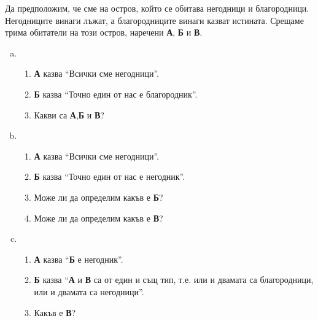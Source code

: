 \begin{problem}
  Да предположим, че сме на остров, който се обитава негодници и благородници.
  Негодниците винаги лъжат, а благородниците винаги казват истината.
  Срещаме трима обитатели на този остров, наречени {\bf А}, {\bf Б} и {\bf В}.
  \begin{enumerate}[a)]
  \item
    \begin{enumerate}[]
    \item
      {\bf А} казва ``Всички сме негодници''.
    \item
      {\bf Б} казва ``Точно един от нас е благородник''.
    \item
      Какви са {\bf А},{\bf Б} и {\bf В}?
    \end{enumerate}
  \item
    \begin{enumerate}[]
    \item
      {\bf А} казва ``Всички сме негодници''.
    \item
      {\bf Б} казва ``Точно един от нас е негодник''.
    \item
      Може ли да определим какъв е {\bf Б}?
    \item
      Може ли да определим какъв е {\bf В}?
    \end{enumerate}
  \item
    \begin{enumerate}[]
    \item
      {\bf А} казва ``{\bf Б} е негодник''.
    \item
      {\bf Б} казва ``{\bf А} и {\bf В} са от един и същ тип, т.е. или и двамата са благородници, или и двамата са негодници''.
    \item
      Какъв е {\bf В}?
    \end{enumerate}
  \end{enumerate}
\end{problem}
